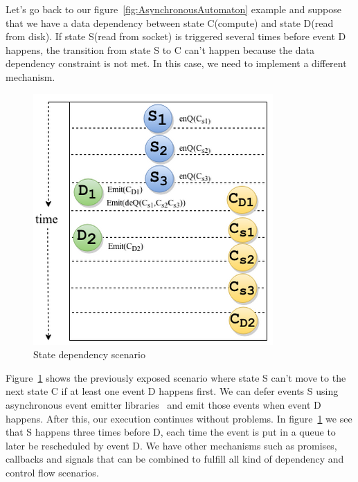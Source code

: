 \documentclass[10pt,reprint]{socc14}
\begin{document}
Let’s go back to our figure~\ref{fig:AsynchronousAutomaton} example and suppose that we have a data dependency between state C(compute) and state D(read from disk). If state S(read from socket) is triggered several times before event D happens, the transition from state S to C can’t happen because the data dependency constraint is not met. In this case, we need to implement a different mechanism. 

\begin{figure}[h]	
	\centering
	\includegraphics[scale=0.6]{StateDependency}
	\caption{State dependency scenario}
	\label{fig:StateDependency}
\end{figure}


Figure~\ref{fig:StateDependency} shows the previously exposed scenario where state S can’t move to the next state C if at least one event D happens first.  We can defer events S using asynchronous event emitter libraries~\cite{Caolan} and emit those events when event D happens. After this, our execution continues without problems. In figure~\ref{fig:StateDependency} we see that S happens three times before D, each time the event is put in a queue to later be rescheduled by event D. We have other mechanisms such as promises, callbacks and signals that can be combined to fulfill all kind of dependency and control flow scenarios.

\end{document}
